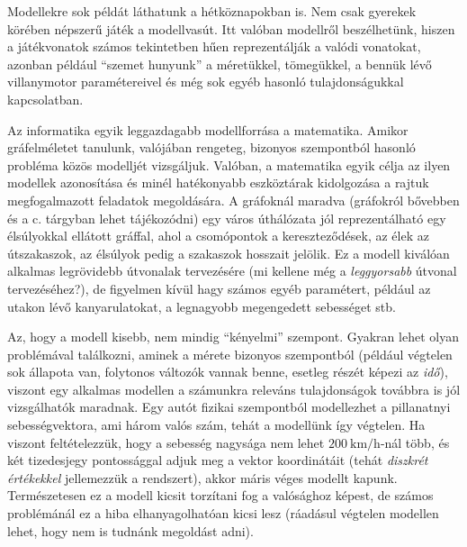 \begin{pelda}
	Modellekre sok példát láthatunk a hétköznapokban is. Nem csak gyerekek körében népszerű játék a modellvasút. Itt valóban modellről beszélhetünk, hiszen a játékvonatok számos tekintetben hűen reprezentálják a valódi vonatokat, azonban például ``szemet hunyunk'' a méretükkel, tömegükkel, a bennük lévő villanymotor paramétereivel és még sok egyéb hasonló tulajdonságukkal kapcsolatban.
	
	Az informatika egyik leggazdagabb modellforrása a matematika. Amikor gráfelméletet tanulunk, valójában rengeteg, bizonyos szempontból hasonló probléma közös modelljét vizsgáljuk. Valóban, a matematika egyik célja az ilyen modellek azonosítása és minél hatékonyabb eszköztárak kidolgozása a rajtuk megfogalmazott feladatok megoldására. A gráfoknál maradva (gráfokról bővebben  és a \bszketto c. tárgyban lehet tájékozódni) egy város úthálózata jól reprezentálható egy élsúlyokkal ellátott gráffal, ahol a csomópontok a kereszteződések, az élek az útszakaszok, az élsúlyok pedig a szakaszok hosszait jelölik. Ez a modell kiválóan alkalmas legrövidebb útvonalak tervezésére (mi kellene még a \emph{leggyorsabb} útvonal tervezéséhez?), de figyelmen kívül hagy számos egyéb paramétert, például az utakon lévő kanyarulatokat, a legnagyobb megengedett sebességet stb.
\end{pelda}

\begin{megjegyzes}
	Az, hogy a modell kisebb, nem mindig ``kényelmi'' szempont. Gyakran lehet olyan problémával találkozni, aminek a mérete bizonyos szempontból  (például végtelen sok állapota van, folytonos változók vannak benne, esetleg részét képezi az \emph{idő}), viszont egy alkalmas  modellen a számunkra releváns tulajdonságok továbbra is jól vizsgálhatók maradnak. Egy autót fizikai szempontból modellezhet a pillanatnyi sebességvektora, ami három valós szám, tehát a modellünk így végtelen. Ha viszont feltételezzük, hogy a sebesség nagysága nem lehet $200~\textrm{km/h}$-nál több, és két tizedesjegy pontossággal adjuk meg a vektor koordinátáit (tehát \emph{diszkrét értékekkel} jellemezzük a rendszert), akkor máris véges modellt kapunk. Természetesen ez a modell kicsit torzítani fog a valósághoz képest, de számos problémánál ez a hiba elhanyagolhatóan kicsi lesz (ráadásul végtelen modellen lehet, hogy nem is tudnánk megoldást adni).
\end{megjegyzes}

